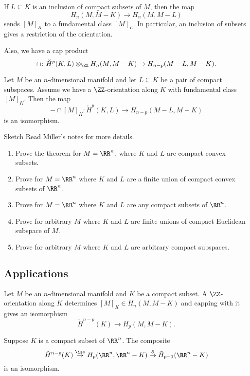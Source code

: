 \documentclass{standalone}
\begin{document}
If \(L \subseteq K\) is an inclusion of compact subsets of \(M\),
then the map
\[
  H_n(M, M - K) \to H_n(M, M - L)
\]
sends \([M]_K\) to a fundamental class \([M]_L\).
In particular, an inclusion of subsets gives a restriction of the orientation.

Also, we have a cap product
\[
  \cap \colon \check H^p(K, L) \otimes_\ZZ H_n(M, M - K) \to
              H_{n - p}(M - L, M - K).
\]

\begin{theorem}
  Let \(M\) be an \(n\)-dimensional manifold and
    let \(L \subseteq K\) be a pair of compact subspaces.
  Assume we have a \(\ZZ\)-orientation along \(K\)
    with fundamental class \([M]_K\).
  Then the map
  \[
    {-} \cap [M]_K \colon \check H^p(K, L) \to H_{n - p}(M - L, M - K)
  \]
  is an isomorphism.
\end{theorem}

\begin{proof*}{Sketch}
  Read Miller's notes for more details.
  \begin{enumerate}[nosep]
    \item Prove the theorem for \(M = \RR^n\),
      where \(K\) and \(L\) are compact convex subsets.
    \item Prove for \(M = \RR^n\) where \(K\) and \(L\) are
      a finite union of compact convex subsets of \(\RR^n\).
    \item Prove for \(M = \RR^n\) where \(K\) and \(L\) are
      any compact subsets of \(\RR^n\).
    \item Prove for arbitrary \(M \) where \(K\) and \(L\) are
      finite unions of compact Euclidean subspace of \(M\).
    \item Prove for arbitrary \(M \) where \(K\) and \(L\) are
      arbitrary compact subspaces. \pog
  \end{enumerate}
\end{proof*}

\subsection{Applications}
\begin{theorem}
  Let \(M\) be an \(n\)-dimensional manifold and \(K\) be a compact subset.
  A \(\ZZ\)-orientation along \(K\) determines \([M]_K \in H_n(M, M - K)\)
  and capping with it gives an isomorphism
  \[
    \check H^{n - p}(K) \to H_p(M, M - K).
  \]
\end{theorem}
\begin{corollary}
  Suppose \(K\) is a compact subset of \(\RR^n\).
  The composite
  \[
    \check H^{n - p}(K) \overset{\iso}{\to}
      H_p(\RR^n, \RR^n - K) \overset{\partial}{\to}
      \tilde H_{p - 1}(\RR^n - K)
  \]
  is an isomorphism.
\end{corollary}
\end{document}
